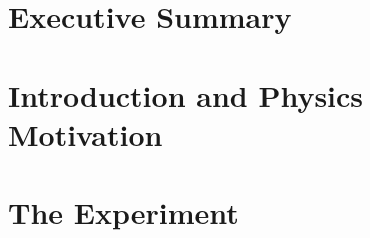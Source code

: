 \documentclass[11pt]{report}
\begin{document}
%
%

\setcounter{tocdepth}{4}
\tableofcontents

\chapter{Executive Summary}
\setcounter{page}{1}
 

%
\chapter{Introduction and Physics Motivation}

 
%
\chapter{The Experiment}
%
 
%
%
%


%
%
%
\clearpage
{}
{}

%
%
%


{}


\end{document}
